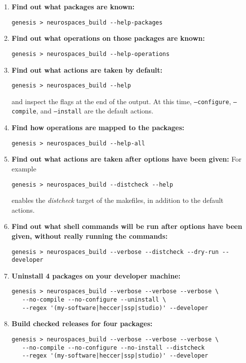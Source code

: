 \documentclass[12pt]{article}
\begin{document}
\begin{enumerate}
\item {\bf Find out what packages are known:}
\begin{verbatim}
genesis > neurospaces_build --help-packages
\end{verbatim}

\item {\bf Find out what operations on those packages are known:}
\begin{verbatim}
genesis > neurospaces_build --help-operations
\end{verbatim}

\item {\bf Find out what actions are taken by default:}
\begin{verbatim}
genesis > neurospaces_build --help
\end{verbatim}
and inspect the flags at the end of the output. At this time, {\tt --configure}, {\tt --compile}, and {\tt --install} are the default actions. 

\item {\bf Find how operations are mapped to the packages:}
\begin{verbatim}
genesis > neurospaces_build --help-all
\end{verbatim}

\item {\bf Find out what actions are taken after options have been given:} For example
\begin{verbatim}
genesis > neurospaces_build --distcheck --help
\end{verbatim}
enables the {\it distcheck} target of the makefiles, in addition to the default actions. 

\item {\bf Find out what shell commands will be run after options have been given, without really running the commands:}
\begin{verbatim}
genesis > neurospaces_build --verbose --distcheck --dry-run --developer
\end{verbatim}

\item {\bf Uninstall 4 packages on your developer machine:}
\begin{verbatim}
genesis > neurospaces_build --verbose --verbose --verbose \
   --no-compile --no-configure --uninstall \
   --regex '(my-software|heccer|ssp|studio)' --developer
\end{verbatim}

\item {\bf Build checked releases for four packages:}
\begin{verbatim}
genesis > neurospaces_build --verbose --verbose --verbose \
   --no-compile --no-configure --no-install --distcheck 
   --regex '(my-software|heccer|ssp|studio)' --developer
\end{verbatim}


\end{enumerate}
\end{document}
